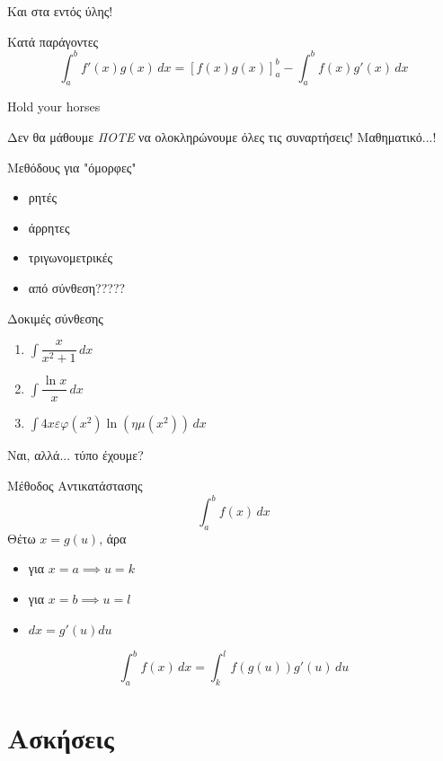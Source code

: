 \documentclass[greek]{beamer}
\begin{document}
\begin{frame}{Και στα εντός ύλης!}
  \begin{block}{Κατά παράγοντες}
    $$\int_a^b f'(x)g(x)\,dx=\left[ f(x)g(x) \right]_a^b -\int_a^b f(x)g'(x)\,dx$$
  \end{block}
\end{frame}

\begin{frame}{Hold your horses}

  Δεν θα μάθουμε \emph{ΠΟΤΕ} να ολοκληρώνουμε όλες τις συναρτήσεις! Μαθηματικό...!

  Μεθόδους για "όμορφες"

  \begin{itemize}
    \item<2-> ρητές
    \item<3-> άρρητες
    \item<4-> τριγωνομετρικές
    \item<5-> από σύνθεση?????
  \end{itemize}

\end{frame}

\begin{frame}{Δοκιμές σύνθεσης}
  \begin{enumerate}
    \item<1-> $\int \dfrac{x}{x^2+1}\,dx$
    \item<2-> $\int \dfrac{\ln x}{x}\, dx$
    \item<3-> $\int 4xεφ(x^2)\ln (ημ(x^2))\, dx$
  \end{enumerate}

\end{frame}

\begin{frame}{Ναι, αλλά... τύπο έχουμε?}
  \begin{block}{Μέθοδος Αντικατάστασης}
    $$\int_a^b f(x)\, dx$$
    Θέτω $x=g(u)$, άρα
    \begin{itemize}
      \item για $x=a\implies u=k$
      \item για $x=b\implies u=l$
      \item $dx=g'(u)du$
    \end{itemize}
    $$\int_a^b f(x)\, dx=\int_{k}^{l} f(g(u))g'(u)\,du$$
  \end{block}

\end{frame}

\section{Ασκήσεις}
\end{document}
